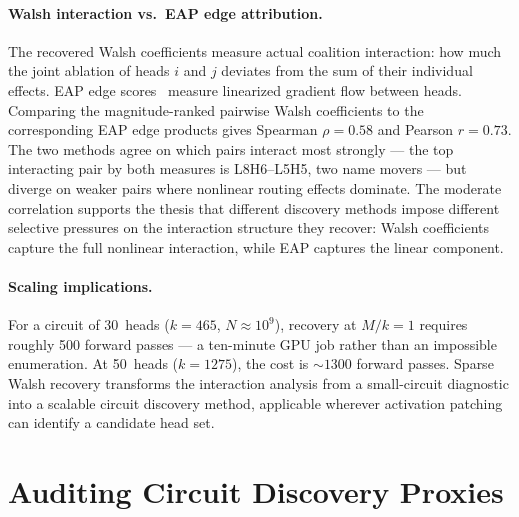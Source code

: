 \documentclass{article}
\begin{document}
\paragraph{Walsh interaction vs.\ EAP edge attribution.}

The recovered Walsh coefficients measure actual coalition interaction: how
much the joint ablation of heads $i$ and $j$ deviates from the sum of their
individual effects. EAP edge scores~\citep{syed2023attribution} measure
linearized gradient flow between heads. Comparing the magnitude-ranked
pairwise Walsh coefficients to the corresponding EAP edge products gives
Spearman $\rho = 0.58$ and Pearson $r = 0.73$. The two methods agree on
which pairs interact most strongly --- the top interacting pair by both
measures is L8H6--L5H5, two name movers --- but diverge on weaker pairs
where nonlinear routing effects dominate. The moderate correlation supports
the thesis that different discovery methods impose different selective
pressures on the interaction structure they recover: Walsh coefficients
capture the full nonlinear interaction, while EAP captures the linear
component.

\paragraph{Scaling implications.}

For a circuit of 30~heads ($k = 465$, $N \approx 10^9$), recovery at
$M/k = 1$ requires roughly 500 forward passes --- a ten-minute GPU job
rather than an impossible enumeration. At 50~heads ($k = 1275$), the
cost is ${\sim}1300$ forward passes. Sparse Walsh recovery transforms
the interaction analysis from a small-circuit diagnostic into a scalable
circuit discovery method, applicable wherever activation patching can
identify a candidate head set.


%
%


\section{Auditing Circuit Discovery Proxies}
\label{sec:auditing}
\end{document}
